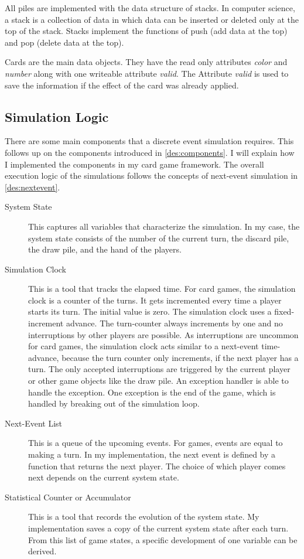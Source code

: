 All piles are implemented with the data structure of stacks. In computer science, a stack is a collection of data in which data can be inserted or deleted only at the top of the stack. \cite[page 86]{patel2018data}
Stacks implement the functions of push (add data at the top) and pop (delete data at the top).

Cards are the main data objects. They have the read only attributes \textit{color} and \textit{number} along with one writeable attribute \textit{valid}.
The Attribute \textit{valid} is used to save the information if the effect of the card was already applied.


\subsection{Simulation Logic}


There are some main components that a discrete event simulation requires.
This follows up on the components introduced in \ref{des:components}. I will explain how I implemented the components in my card game framework.
The overall execution logic of the simulations follows the concepts of next-event simulation in \ref{des:nextevent}.

\begin{description}
\item[System State] This captures all variables that characterize the simulation. In my case, the system state consists of the number of the current turn, the discard pile, the draw pile, and the hand of the players.

\item[Simulation Clock] This is a tool that tracks the elapsed time. For card games, the simulation clock is a counter of the turns. It gets incremented every time a player starts its turn. The initial value is zero. The simulation clock uses a fixed-increment advance. The turn-counter always increments by one and no interruptions by other players are possible. As interruptions are uncommon for card games, the simulation clock acts similar to a next-event time-advance, because the turn counter only increments, if the next player has a turn. The only accepted interruptions are triggered by the current player or other game objects like the draw pile. An exception handler is able to handle the exception. One exception is the end of the game, which is handled by breaking out of the simulation loop.

\item[Next-Event List] This is a queue of the upcoming events. For games, events are equal to making a turn. In my implementation, the next event is defined by a function that returns the next player. The choice of which player comes next depends on the current system state.

\item[Statistical Counter or Accumulator] This is a tool that records the evolution of the system state. My implementation saves a copy of the current system state after each turn. From this list of game states, a specific development of one variable can be derived.

\end{description}

